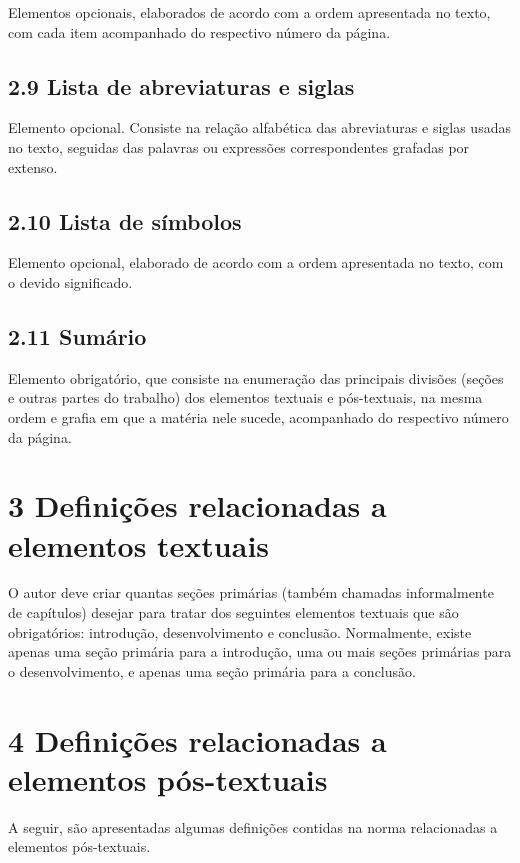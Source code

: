 \documentclass[
	12pt,				%
	oneside,			%
	a4paper,			%
	english,			%
	brazil				%
	]{abntex2ppgsi}
\begin{document}
\begin{anexosenv}
Elementos opcionais, elaborados de acordo com a ordem apresentada no texto, com cada item acompanhado do respectivo número da página.

\subsection*{2.9 Lista de abreviaturas e siglas}

Elemento opcional. Consiste na relação alfabética das abreviaturas e siglas usadas no texto, seguidas das palavras ou expressões correspondentes grafadas por extenso.

\subsection*{2.10 Lista de símbolos}

Elemento opcional, elaborado de acordo com a ordem apresentada no texto, com o devido significado.

\subsection*{2.11 Sumário}

Elemento obrigatório, que consiste na enumeração das principais divisões (seções e outras partes do trabalho) dos elementos textuais e pós-textuais, na mesma ordem e grafia em que a matéria nele sucede, acompanhado do respectivo número da página.

\section*{3 Definições relacionadas a elementos textuais}

O autor deve criar quantas seções primárias (também chamadas informalmente de capítulos) desejar para tratar dos seguintes elementos textuais que são obrigatórios: introdução, desenvolvimento e conclusão. Normalmente, existe apenas uma seção primária para a introdução, uma ou mais seções primárias para o desenvolvimento, e apenas uma seção primária para a conclusão.

\section*{4 Definições relacionadas a elementos pós-textuais}

A seguir, são apresentadas algumas definições contidas na norma relacionadas a elementos pós-textuais.


\end{anexosenv}
\end{document}
